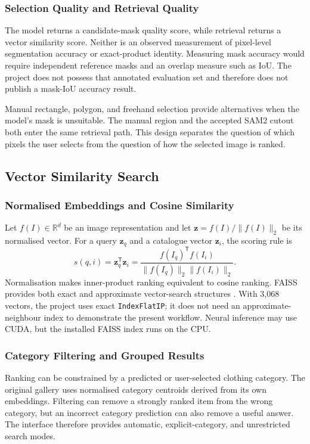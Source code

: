 \subsubsection{Selection Quality and Retrieval Quality}
The model returns a candidate-mask quality score, while retrieval returns a
vector similarity score. Neither is an observed measurement of pixel-level
segmentation accuracy or exact-product identity. Measuring mask accuracy would
require independent reference masks and an overlap measure such as IoU. The
project does not possess that annotated evaluation set and therefore does not
publish a mask-IoU accuracy result.

Manual rectangle, polygon, and freehand selection provide alternatives when the
model's mask is unsuitable. The manual region and the accepted SAM2 cutout both
enter the same retrieval path. This design separates the question of which pixels
the user selects from the question of how the selected image is ranked.

\subsection{Vector Similarity Search}
\subsubsection{Normalised Embeddings and Cosine Similarity}
Let $f(I)\in\mathbb{R}^{d}$ be an image representation and let
$\mathbf{z}=f(I)/\lVert f(I)\rVert_2$ be its normalised vector. For a query
$\mathbf{z}_q$ and a catalogue vector $\mathbf{z}_i$, the scoring rule is
\begin{equation}
 s(q,i)=\mathbf{z}_q^{\mathsf T}\mathbf{z}_i
 =\frac{f(I_q)^{\mathsf T} f(I_i)}{\lVert f(I_q)\rVert_2\lVert f(I_i)\rVert_2}.
 \label{eq:cosine}
\end{equation}
Normalisation makes inner-product ranking equivalent to cosine ranking. FAISS
provides both exact and approximate vector-search structures
\cite{Johnson2017FAISS,FaissIndexes}. With 3,068 vectors, the project uses exact
\texttt{IndexFlatIP}; it does not need an approximate-neighbour index to demonstrate
the present workflow. Neural inference may use CUDA, but the installed FAISS
index runs on the CPU.

\subsubsection{Category Filtering and Grouped Results}
Ranking can be constrained by a predicted or user-selected clothing category.
The original gallery uses normalised category centroids derived from its own
embeddings. Filtering can remove a strongly ranked item from the wrong category,
but an incorrect category prediction can also remove a useful answer. The
interface therefore provides automatic, explicit-category, and unrestricted
search modes.

